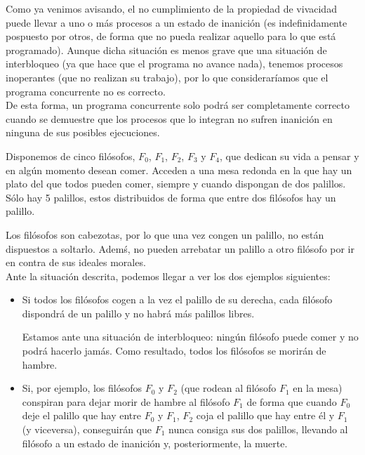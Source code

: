Como ya venimos avisando, el no cumplimiento de la propiedad de vivacidad puede llevar a uno o más procesos a un estado de inanición (es indefinidamente pospuesto por otros, de forma que no pueda realizar aquello para lo que está programado). Aunque dicha situación es menos grave que una situación de interbloqueo (ya que hace que el programa no avance nada), tenemos procesos inoperantes (que no realizan su trabajo), por lo que consideraríamos que el programa concurrente no es correcto.\\

De esta forma, un programa concurrente solo podrá ser completamente correcto cuando se demuestre que los procesos que lo integran no sufren inanición en ninguna de sus posibles ejecuciones.

\begin{ejemplo}
    Disponemos de cinco filósofos, $F_0$, $F_1$, $F_2$, $F_3$ y $F_4$, que dedican su vida a pensar y en algún momento desean comer. Acceden a una mesa redonda en la que hay un plato del que todos pueden comer, siempre y cuando dispongan de dos palillos. Sólo hay 5 palillos, estos distribuidos de forma que entre dos filósofos hay un palillo.

    Los filósofos son cabezotas, por lo que una vez congen un palillo, no están dispuestos a soltarlo. Ademś, no pueden arrebatar un palillo a otro filósofo por ir en contra de sus ideales morales.\\

    Ante la situación descrita, podemos llegar a ver los dos ejemplos siguientes:
    \begin{itemize}
        \item Si todos los filósofos cogen a la vez el palillo de su derecha, cada filósofo dispondrá de un palillo y no habrá más palillos libres. 

            Estamos ante una situación de interbloqueo: ningún filósofo puede comer y no podrá hacerlo jamás. Como resultado, todos los filósofos se morirán de hambre.
        \item Si, por ejemplo, los filósofos $F_0$ y $F_2$ (que rodean al filósofo $F_1$ en la mesa) conspiran para dejar morir de hambre al filósofo $F_1$ de forma que cuando $F_0$ deje el palillo que hay entre $F_0$ y $F_1$, $F_2$ coja el palillo que hay entre él y $F_1$ (y viceversa), conseguirán que $F_1$ nunca consiga sus dos palillos, llevando al filósofo a un estado de inanición y, posteriormente, la muerte.
    \end{itemize}
\end{ejemplo}

